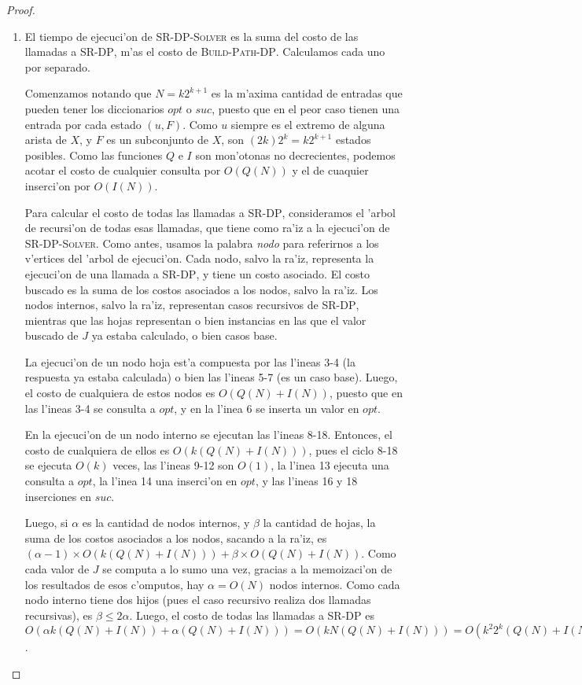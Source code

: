 \begin{theorem}
\begin{proof}
\begin{enumerate}
\item El tiempo de ejecuci'on de \textsc{SR-DP-Solver} es la suma del costo de las llamadas a \textsc{SR-DP}, m'as el costo de \textsc{Build-Path-DP}. Calculamos cada uno por separado.

Comenzamos notando que $N = k2^{k + 1}$ es la m'axima cantidad de entradas que pueden tener los diccionarios $opt$ o $suc$, puesto que en el peor caso tienen una entrada por cada estado $(u, F)$. Como $u$ siempre es el extremo de alguna arista de $X$, y $F$ es un subconjunto de $X$, son $(2k) 2^k = k 2^{k + 1}$ estados posibles. Como las funciones $Q$ e $I$ son mon'otonas no decrecientes, podemos acotar el costo de cualquier consulta por $O(Q(N))$ y el de cuaquier inserci'on por $O(I(N))$.

Para calcular el costo de todas las llamadas a \textsc{SR-DP}, consideramos el 'arbol de recursi'on de todas esas llamadas, que tiene como ra'iz a la ejecuci'on de \textsc{SR-DP-Solver}. Como antes, usamos la palabra \textit{nodo} para referirnos a los v'ertices del 'arbol de ejecuci'on. Cada nodo, salvo la ra'iz, representa la ejecuci'on de una llamada a \textsc{SR-DP}, y tiene un costo asociado. El costo buscado es la suma de los costos asociados a los nodos, salvo la ra'iz. Los nodos internos, salvo la ra'iz, representan casos recursivos de \textsc{SR-DP}, mientras que las hojas representan o bien instancias en las que el valor buscado de $J$ ya estaba calculado, o bien casos base.

La ejecuci'on de un nodo hoja est'a compuesta por las l'ineas 3-4 (la respuesta ya estaba calculada) o bien las l'ineas 5-7 (es un caso base). Luego, el costo de cualquiera de estos nodos es $O(Q(N) + I(N))$, puesto que en las l'ineas 3-4 se consulta a $opt$, y en la l'inea 6 se inserta un valor en $opt$.

En la ejecuci'on de un nodo interno se ejecutan las l'ineas 8-18. Entonces, el costo de cualquiera de ellos es $O(k(Q(N) + I(N)))$, pues el ciclo 8-18 se ejecuta $O(k)$ veces, las l'ineas 9-12 son $O(1)$, la l'inea 13 ejecuta una consulta a $opt$, la l'inea 14 una inserci'on en $opt$, y las l'ineas 16 y 18 inserciones en $suc$.

Luego, si $\alpha$ es la cantidad de nodos internos, y $\beta$ la cantidad de hojas, la suma de los costos asociados a los nodos, sacando a la ra'iz, es $(\alpha - 1) \times O(k(Q(N) + I(N))) + \beta \times O(Q(N) + I(N))$. Como cada valor de $J$ se computa a lo sumo una vez, gracias a la memoizaci'on de los resultados de esos c'omputos, hay $\alpha = O(N)$ nodos internos. Como cada nodo interno tiene dos hijos (pues el caso recursivo realiza dos llamadas recursivas), es $\beta \leq 2\alpha$. Luego, el costo de todas las llamadas a \textsc{SR-DP} es $O(\alpha k(Q(N) + I(N)) + \alpha(Q(N) + I(N))) = O(kN(Q(N) + I(N))) = O(k^2 2^k(Q(N) + I(N)))$.


\end{enumerate}
\end{proof}
\end{theorem}
